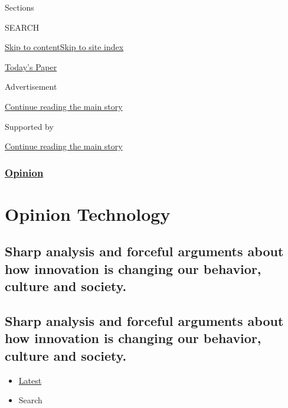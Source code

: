 Sections

SEARCH

\protect\hyperlink{site-content}{Skip to
content}\protect\hyperlink{site-index}{Skip to site index}

\href{https://myaccount.nytimes3xbfgragh.onion/auth/login?response_type=cookie\&client_id=vi}{}

\href{https://www.nytimes3xbfgragh.onion/section/todayspaper}{Today's
Paper}

Advertisement

\protect\hyperlink{after-top}{Continue reading the main story}

Supported by

\protect\hyperlink{after-sponsor}{Continue reading the main story}

\hypertarget{opinion}{%
\subsubsection{\texorpdfstring{\href{/section/opinion}{Opinion}}{Opinion}}\label{opinion}}

\hypertarget{opinion--technology}{%
\section{Opinion \textbar{} Technology}\label{opinion--technology}}

\hypertarget{sharp-analysis-and-forceful-arguments-about-how-innovation-is-changing-our-behavior-culture-and-society}{%
\subsection{Sharp analysis and forceful arguments about how innovation
is changing our behavior, culture and
society.}\label{sharp-analysis-and-forceful-arguments-about-how-innovation-is-changing-our-behavior-culture-and-society}}

\hypertarget{sharp-analysis-and-forceful-arguments-about-how-innovation-is-changing-our-behavior-culture-and-society-1}{%
\subsection{Sharp analysis and forceful arguments about how innovation
is changing our behavior, culture and
society.}\label{sharp-analysis-and-forceful-arguments-about-how-innovation-is-changing-our-behavior-culture-and-society-1}}

\begin{itemize}
\tightlist
\item
  \protect\hyperlink{stream-panel}{Latest}
\item
  Search
\end{itemize}

